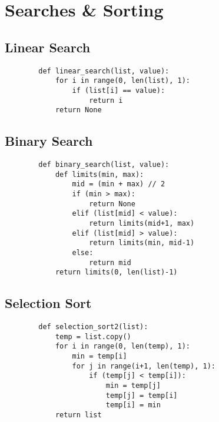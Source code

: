 \newpage

\section[Day 2: Searches \& Sorting]{ Searches \& Sorting }

\subsection{ Linear Search }

    \begin{lstlisting}
        def linear_search(list, value):
            for i in range(0, len(list), 1):
                if (list[i] == value):
                    return i
            return None
    \end{lstlisting}





\subsection{ Binary Search }

    \begin{lstlisting}
        def binary_search(list, value):
            def limits(min, max):
                mid = (min + max) // 2
                if (min > max):
                    return None
                elif (list[mid] < value):
                    return limits(mid+1, max)
                elif (list[mid] > value):
                    return limits(min, mid-1)
                else:
                    return mid
            return limits(0, len(list)-1)
    \end{lstlisting}





\subsection{ Selection Sort }

    \begin{lstlisting}
        def selection_sort2(list):
            temp = list.copy()
            for i in range(0, len(temp), 1):
                min = temp[i]
                for j in range(i+1, len(temp), 1):
                    if (temp[j] < temp[i]):
                        min = temp[j]
                        temp[j] = temp[i]
                        temp[i] = min
            return list
    \end{lstlisting}

